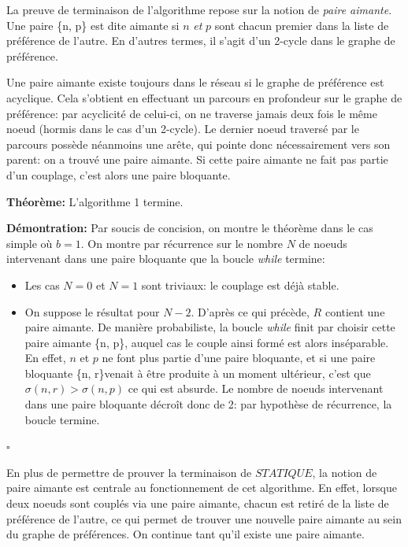 \documentclass[12pt,a4paper]{article}
\begin{document}
La preuve de terminaison de l'algorithme repose sur la notion de \textit{paire aimante}. 
Une paire \{n, p\} est dite aimante si $n$ \textit{et} $p$ sont chacun premier dans la liste de préférence de l'autre. En d'autres termes, il s'agit d'un 2-cycle dans le graphe de préférence. 

Une paire aimante existe toujours dans le réseau si le graphe de préférence est acyclique. 
Cela s'obtient en effectuant un parcours en profondeur sur le graphe de préférence: par acyclicité de celui-ci, on ne traverse jamais deux fois le même noeud (hormis dans le cas d'un 2-cycle). 
Le dernier noeud traversé par le parcours possède néanmoins une arête, qui pointe donc nécessairement vers son parent: on a trouvé une paire aimante. 
Si cette paire aimante ne fait pas partie d'un couplage, c'est alors une paire bloquante.

\vspace{0.2cm}
\textbf{Théorème:} L'algorithme 1 termine.

\vspace{0.2cm}
\textbf{Démontration: } Par soucis de concision, on montre le théorème dans le cas simple où $b=1$. On montre par récurrence sur le nombre $N$ de noeuds intervenant dans une paire bloquante que la boucle \textit{while} termine: 
\begin{itemize}
    \item Les cas $N=0$ et $N=1$ sont triviaux: le couplage est déjà stable.
    \item On suppose le résultat pour $N-2$. D'après ce qui précède, $R$ contient une paire aimante. De manière probabiliste, la boucle \textit{while} finit par choisir cette paire aimante \{n, p\}, auquel cas le couple ainsi formé est alors inséparable. En effet, $n$ et $p$ ne font plus partie d'une paire bloquante, et si une paire bloquante \{n, r\}venait à être produite à un moment ultérieur, c'est que $\sigma(n, r) > \sigma(n, p)$ ce qui est absurde. Le nombre de noeuds intervenant dans une paire bloquante décroît donc de 2: par hypothèse de récurrence, la boucle termine.
\end{itemize}
$\square$

\vspace{0.2cm}

En plus de permettre de prouver la terminaison de $STATIQUE$, la notion de paire aimante est centrale au fonctionnement de cet algorithme. En effet, lorsque deux noeuds sont couplés via une paire aimante, chacun est retiré de la liste de préférence de l'autre, ce qui permet de trouver une nouvelle paire aimante au sein du graphe de préférences. On continue tant qu'il existe une paire aimante.
\end{document}
